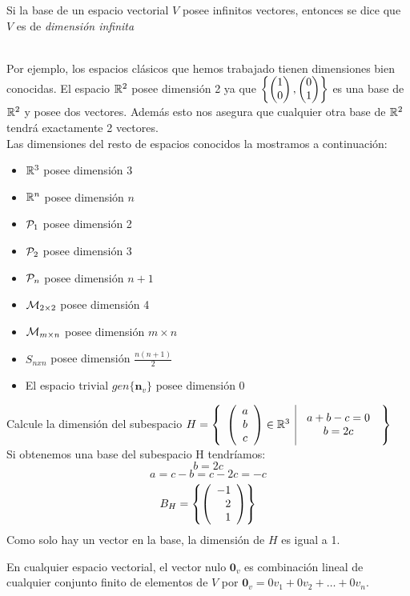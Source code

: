 Si la base de un espacio vectorial $V$ posee infinitos vectores, entonces se dice que $V$ es de  \textit{dimensión infinita} 

~\\
Por ejemplo, los espacios clásicos que hemos trabajado tienen dimensiones bien conocidas. El espacio $\mathbb{R}^2 $ posee dimensión 2 ya que $ \left\{\begin{pmatrix} 1\\ 0\\ \end{pmatrix} , \begin{pmatrix} 0\\ 1\\ \end{pmatrix}  \right\} $ es una base de $\mathbb{R}^2$ y posee dos vectores. Además esto nos asegura que cualquier otra base de $ \mathbb{R}^2$ tendrá exactamente 2 vectores.
~\\

Las dimensiones del resto de espacios conocidos la mostramos a continuación:

\begin{itemize}
\item $\mathbb{R}^3 $ posee dimensión 3
\item $\mathbb{R}^n$ posee dimensión $n$
\item $\mathcal{P}_1$ posee dimensión 2
\item $\mathcal{P}_2$ posee dimensión 3
\item $\mathcal{P}_n$ posee dimensión $n+1$
\item $\mathcal{M}_{2\times 2}$ posee  dimensión 4
\item $\mathcal{M}_{m\times n}$ posee  dimensión $m\times n$ 
\item $S_{nxn}$ posee  dimensión $\frac{n(n+1)}{2}$ 
\item El espacio trivial $gen\{\mathbf{n}_v\}$ posee dimensión 0

\end{itemize}
\begin{ejemplo}
Calcule la dimensión del subespacio $H= \left\{\begin{array}{c|c} {\left( \begin{array}{c} a\\ b\\ c \end{array}\right) \in \mathbb{R}^3 }&{\begin{array}{c}
a+b-c=0\\
b=2c
\end{array}} \end{array} \right\}$
~\\
\sol
Si obtenemos una base del subespacio H tendríamos:
\[b=2c\]
\[ a=c-b=c-2c=-c\]
\[B_H= \left\{\left( \begin{array}{r} -1\\ 2\\ 1 \end{array} \right)  \right\} \]
Como solo hay un vector en la base, la dimensión de $H$ es igual a 1.

\end{ejemplo}

\begin{obsimp}
En cualquier espacio vectorial, el vector nulo $\mathbf{0}_v$ es combinación lineal de cualquier conjunto finito de elementos de $V$  por $\mathbf{0}_v = 0 v_1 + 0 v_2 + \ldots + 0 v_n$.\\
\end{obsimp}

